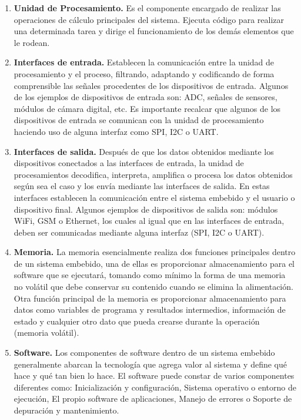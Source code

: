 	\begin{enumerate}
		\item \textbf{Unidad de Procesamiento.} Es el componente encargado de realizar las operaciones de cálculo principales del sistema. Ejecuta código para realizar una determinada tarea y dirige el funcionamiento de los demás elementos que le rodean.
		\item \textbf{Interfaces de entrada.} Establecen la comunicación entre la unidad de procesamiento y el proceso, filtrando, adaptando y codificando de forma comprensible las señales procedentes de los dispositivos de entrada. Algunos de los ejemplos de dispositivos de entrada son: ADC, señales de sensores, módulos de cámara digital, etc. Es importante recalcar que algunos de los dispositivos de entrada se comunican con la unidad de procesamiento haciendo uso de alguna interfaz como SPI, I2C o UART.
		\item \textbf{Interfaces de salida.} Después de que los datos obtenidos mediante los dispositivos conectados a las interfaces de entrada, la unidad de procesamientos decodifica, interpreta, amplifica o procesa los datos obtenidos según sea el caso y los envía mediante las interfaces de salida. En estas interfaces establecen la comunicación entre el sistema embebido y el usuario o dispositivo final. Algunos ejemplos de dispositivos de salida son: módulos WiFi, GSM o Ethernet, los cuales al igual que en las interfaces de entrada, deben ser comunicadas mediante alguna interfaz (SPI, I2C o UART).
		\item \textbf{Memoria.} La memoria esencialmente realiza dos funciones principales dentro de un sistema embebido, una de ellas es proporcionar almacenamiento para el software que se ejecutará, tomando como mínimo la forma de una memoria no volátil que debe conservar su contenido cuando se elimina la alimentación. Otra función principal de la memoria es proporcionar almacenamiento para datos como variables de programa y resultados intermedios, información de estado y cualquier otro dato que pueda crearse durante la operación (memoria volátil).
		\item \textbf{Software.} Los componentes de software dentro de un sistema embebido generalmente abarcan la tecnología que agrega valor al sistema y define qué hace y qué tan bien lo hace. El software puede constar de varios componentes diferentes como: Inicialización y configuración, Sistema operativo o entorno de ejecución, El propio software de aplicaciones, Manejo de errores o Soporte de depuración y mantenimiento.

	\end{enumerate}
	
